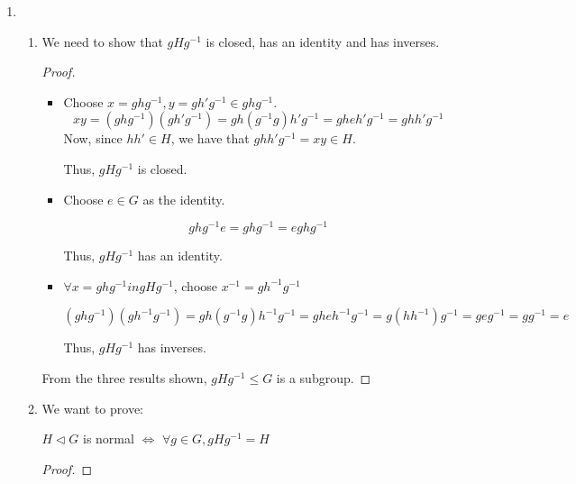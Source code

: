 \documentclass[12pt,letterpaper]{article}
\newcommand{\KER}[1]{\text{ker }#1}
\newcommand{\ghg}[1]{g#1g^{-1}}
\begin{document}
\begin{enumerate}
\begin{proof}
        Thus, we have shown both directions and $\varphi(x) = \varphi(y) \iff xy^{-1} \in \KER{\varphi}$.
      \end{proof}

    \item
      \begin{enumerate}
        \item
          We need to show that $gHg^{-1}$ is closed,
          has an identity and has inverses.

          \begin{proof}
            \begin{itemize}
              \item

                Choose $x = \ghg{h}, y = \ghg{h'} \in \ghg{h}$.
                \[
                  xy = (\ghg{h})(\ghg{h'}) = \ghg{h(g^{-1}g)h'} = \ghg{heh'} = \ghg{hh'}
                \]
                Now, since $hh' \in H$, we have that $\ghg{hh'} = xy \in H$.

                Thus, $\ghg{H}$ is closed.

              \item

                Choose $e \in G$ as the identity.

                \[
                  \ghg{h}e = \ghg{h} = e\ghg{h}
                \]

                Thus, $\ghg{H}$ has an identity.

              \item

                $\forall x = \ghg{h} in \ghg{H}$, choose $x^{-1} = \ghg{h^{-1}}$

                \[
                  (\ghg{h})(\ghg{h^{-1}}) = \ghg{h(g^{-1}g)h^{-1}} = \ghg{heh^{-1}} = \ghg{(hh^{-1})} = \ghg{e} = \ghg{} = e
                \]

                Thus, $\ghg{H}$ has inverses.
            \end{itemize}

            From the three results shown, $\ghg{H} \le G$ is a subgroup.
          \end{proof}

        \item
          We want to prove:

          $H \triangleleft G$ is normal $\iff$ $\forall g \in G, \ghg{H} = H$

          \begin{proof}


\end{proof}
\end{enumerate}
\end{enumerate}
\end{document}
